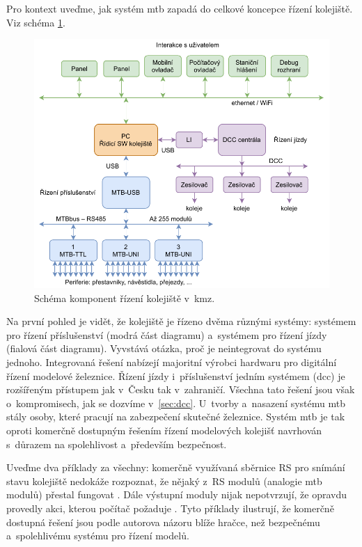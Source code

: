 Pro kontext uveďme, jak systém \gls{mtb} zapadá do celkové koncepce řízení
kolejiště. Viz schéma \ref{fig:control-topology}.

\begin{figure}[ht]
\includegraphics[width=\textwidth]{data/railroad-diagram.pdf}
\caption{Schéma komponent řízení kolejiště v~\gls{kmz}.}
\label{fig:control-topology}
\end{figure}

Na první pohled je vidět, že kolejiště je řízeno dvěma různými systémy:
systémem pro řízení příslušenství (modrá část diagramu) a~systémem pro řízení
jízdy (fialová část diagramu). Vyvstává otázka, proč je neintegrovat do systému
jednoho. Integrovaná řešení nabízejí majoritní výrobci hardwaru pro digitální
řízení modelové železnice.  Řízení jízdy i~příslušenství jedním systémem (\gls{dcc})
je rozšířeným přístupem jak v~Česku tak v~zahraničí. Všechna tato řešení jsou
však o~kompromisech, jak se dozvíme v~\ref{sec:dcc}. U~tvorby a~nasazení
systému \gls{mtb} stály osoby, které pracují na zabezpečení skutečné železnice.
Systém \gls{mtb} je tak oproti komerčně dostupným řešením řízení modelových
kolejišť navrhován s~důrazem na spolehlivost a~především bezpečnost.

Uveďme dva příklady za všechny: komerčně využívaná sběrnice RS pro snímání
stavu kolejiště nedokáže rozpoznat, že nějaký z~RS modulů (analogie \gls{mtb}
modulů) přestal fungovat \cite{rs:web}. Dále výstupní moduly nijak nepotvrzují,
že opravdu provedly akci, kterou počítač požaduje \cite{dcc_specs:web}. Tyto
příklady ilustrují, že komerčně dostupná řešení jsou podle autorova názoru blíže
hračce, než bezpečnému a~spolehlivému systému pro řízení modelů.

